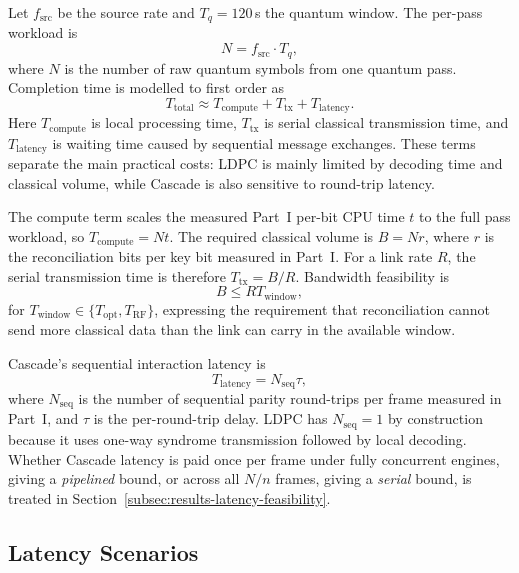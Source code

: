 \documentclass{UoYCSproject}
\begin{document}
Let $f_{\text{src}}$ be the source rate and $T_q = 120$\,s the quantum
window. The per-pass workload is
\begin{equation}
N = f_{\text{src}} \cdot T_q,
\end{equation}
where $N$ is the number of raw quantum symbols from one quantum pass.
Completion time is modelled to first
order as
\begin{equation}
T_{\text{total}} \approx T_{\text{compute}} + T_{\text{tx}} + T_{\text{latency}}.
\end{equation}
Here $T_{\text{compute}}$ is local processing time, $T_{\text{tx}}$ is serial
classical transmission time, and $T_{\text{latency}}$ is waiting time caused by
sequential message exchanges. These terms separate the main practical costs:
LDPC is mainly limited by decoding time and classical volume, while Cascade is
also sensitive to round-trip latency.

The compute term scales the measured Part~I per-bit CPU time $t$ to the full
pass workload, so $T_{\text{compute}} = Nt$. The required classical volume is
$B = Nr$, where $r$ is the reconciliation bits per key bit measured in Part~I.
For a link rate $R$, the serial transmission time is therefore
$T_{\text{tx}} = B/R$. Bandwidth feasibility is
\begin{equation}
B \le R T_{\text{window}},
\end{equation}
for $T_{\text{window}} \in \{T_{\text{opt}},T_{\text{RF}}\}$, expressing the
requirement that reconciliation cannot send more classical data than the link
can carry in the available window.

Cascade's sequential interaction latency is
\begin{equation}
T_{\text{latency}} = N_{\text{seq}}\tau,
\end{equation}
where $N_{\text{seq}}$ is the number of sequential parity round-trips per frame
measured in Part~I, and $\tau$ is the per-round-trip delay. LDPC has
$N_{\text{seq}} = 1$ by construction because it uses one-way syndrome
transmission followed by local decoding. Whether Cascade latency is paid once
per frame under fully concurrent engines, giving a \emph{pipelined} bound, or
across all $N/n$ frames, giving a \emph{serial} bound, is treated in
Section~\ref{subsec:results-latency-feasibility}.

\subsection{Latency Scenarios}
\label{subsec:meth-latency}
\end{document}
